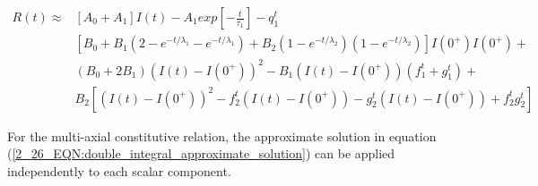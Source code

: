 \begin{equation}
\begin{aligned}
R(t) \approx 
&\left[A_0+ A_1 \right]I(t)-A_1 exp \left[- \frac{t}{\tau_1}\right] -q_1^t \\
&\left[B_0+B_1 (2-e^{-t/\lambda_1}-e^{-t/\lambda_1}) +B_2(1-e^{-t/\lambda_2})(1-e^{-t/\lambda_2}) \right]I(0^+)I(0^+)+ \\
&(B_0+2B_1)(I(t)-I(0^+))^2-B_1(I(t)-I(0^+))(f_1^t+g_1^t)+\\
&B_2\left[ (I(t)-I(0^+))^2 -f_2^t (I(t)-I(0^+)) -g_2^t (I(t)-I(0^+)) +f_2^t g_2^t\right]
\end{aligned} 
\label{2_26_EQN:double_integral_approximate_solution}
\end{equation}

For the multi-axial constitutive relation, the approximate solution in equation (\ref{2_26_EQN:double_integral_approximate_solution}) can be applied independently to each scalar component. 

